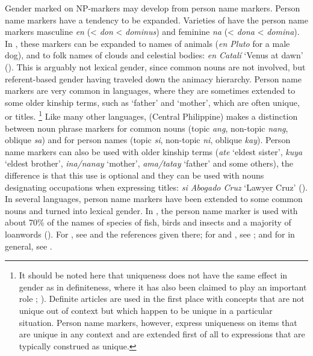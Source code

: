 \documentclass[output=collectionpaper]{langsci/langscibook}
\begin{document}
Gender marked on NP-markers may develop from person name markers. Person name markers have a tendency to be expanded. Varieties of  have the person name markers masculine \textit{en} (< \textit{don} <  \textit{dominus}) and feminine \textit{na} (< \textit{dona} <  \textit{domina}). In , these markers can be expanded to names of animals (\textit{en Pluto} for a male dog), and to folk names of clouds and celestial bodies: \textit{en Catalí} `Venus at dawn' (\citealt[195--197]{CaroReina2018}). This is arguably not lexical gender, since common nouns are not involved, but referent-based gender having traveled down the animacy hierarchy. Person name markers are very common in  languages, where they are sometimes extended to some older kinship terms, such as `father' and `mother', which are often unique, or titles.%
\footnote{%
It should be noted here that uniqueness does not have the same effect in gender as in definiteness, where it has also been claimed to play an important role \citealt{Russell1905}; \citealt{Lyons1999}). Definite articles are used in the first place with concepts that are not unique out of context but which happen to be unique in a particular situation. Person name markers, however, express uniqueness on items that are unique in any context and are extended first of all to expressions that are typically construed as unique.
} %
Like many other  languages,  (Central Philippine) makes a distinction between noun phrase markers for common nouns (topic \textit{ang}, non-topic \textit{nang}, oblique \textit{sa}) and for person names (topic \textit{si}, non-topic \textit{ni}, oblique \textit{kay}). Person name markers can also be used with older kinship terms (\textit{ate} `eldest sister', \textit{kuya} `eldest brother', \textit{ina/nanay} `mother', \textit{ama/tatay} `father' and some others), the difference is that this use is optional and they can be used with nouns designating occupations when expressing titles: \textit{si Abogado Cruz} `Lawyer Cruz' (\citealt[94]{Schachter1972}). In several  languages, person name markers have been extended to some common nouns and turned into lexical gender. In , the person name marker is used with about 70\% of the names of species of fish, birds and insects and a majority of loanwords (\citealt[166--167]{Johnston1980}). For , see  and the references given there; for  and , see ; and for  in general, see \cite{Handschuh2018}.
\end{document}
